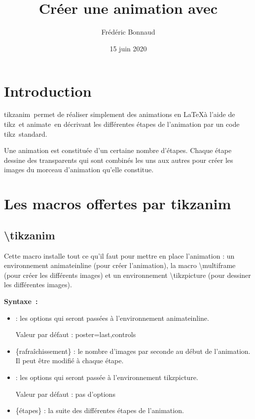 \documentclass[a4paper,12pt]{article}
\author{Frédéric Bonnaud}%
\title{\TikzAnimate\\ Créer une animation avec \Tikz}
\date{15 juin 2020}
\newcommand\Tikz{{\ttfamily tikz}}
\newcommand\TikzAnimate{{\ttfamily tikzanim}}
\newcommand\Animate{{\ttfamily animate}}
\begin{document}
\maketitle

\tableofcontents

\section{Introduction}

\TikzAnimate\ permet de réaliser simplement des animations en \LaTeX à l'aide de \Tikz\ et \Animate\ en décrivant les différentes étapes de l'animation par un code \Tikz\ standard.

Une animation est constituée d'un certaine nombre d'étapes. Chaque étape dessine des transparents qui sont combinés les uns aux autres pour créer les images du morceau d'animation qu'elle constitue.


\section{Les macros offertes par \TikzAnimate}

\subsection{\ttfamily\textbackslash tikzanim}

	Cette macro installe tout ce qu'il faut pour mettre en place l'animation : un environnement {\ttfamily animateinline} (pour créer l'animation), la macro {\ttfamily\textbackslash multiframe} (pour créer les différents images) et un environnement {\ttfamily\textbackslash tikzpicture} (pour dessiner les différentes images).
	
	\textbf{Syntaxe~:} 
	
	
	\begin{itemize}
		\item {} : les options qui seront passées à l'environnement {\ttfamily animateinline}.
		
		Valeur par défaut : {\ttfamily poster=last,controls}
		\item {\ttfamily \{rafraîchissement\}} : le nombre d'images par seconde au début de l'animation. Il peut être modifié à chaque étape.
		\item {} : les options qui seront passée à l'environnement {\ttfamily tikzpicture}.
		
		Valeur par défaut : pas d'options
		\item {\ttfamily \{étapes\}} : la suite des différentes étapes de l'animation. 
	\end{itemize}
	
\end{document}
